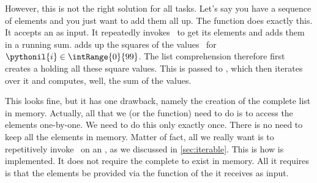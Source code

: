 However, this is not the right solution for all tasks.
Let's say you have a sequence of elements and you just want to add them all up.
The  function does exactly this.
It accepts an  as input.
It repeatedly invokes~ to get its elements and adds them in a running sum.
 adds up the squares of the values~ for~$\pythonil{i}\in\intRange{0}{99}$.
The list comprehension therefore first creates a  holding all these square values.
This  is passed to , which then iterates over it and computes, well, the sum of the values.

This looks fine, but it has one drawback, namely the creation of the complete list in memory.
Actually, all that we (or the  function) need to do is to access the elements one-by-one.
We need to do this only exactly once.
There is no need to keep all the elements in memory.
Matter of fact, all we really want is to repetitively invoke~ on an , as we discussed in \cref{sec:iterable}.
This is how  is implemented.
It does not require the complete  to exist in memory.
All it requires is that the elements be provided via the  function of the  it receives as input.

